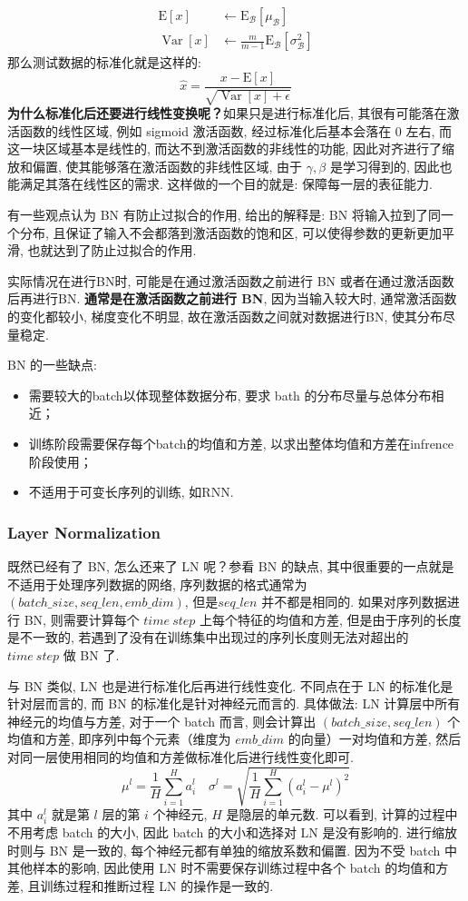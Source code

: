 $$
\begin{aligned}
	\mathrm{E}[x] & \leftarrow \mathrm{E}_{\mathcal{B}}\left[\mu_{\mathcal{B}}\right] \\
	\operatorname{Var}[x] & \leftarrow \frac{m}{m-1} \mathrm{E}_{\mathcal{B}}\left[\sigma_{\mathcal{B}}^{2}\right]
\end{aligned}
$$
那么测试数据的标准化就是这样的: 
$$
\widehat{x}=\frac{x-\mathrm{E}[x]}{\sqrt{\operatorname{Var}[x]+\epsilon}}
$$
\textbf{为什么标准化后还要进行线性变换呢？}如果只是进行标准化后, 其很有可能落在激活函数的线性区域, 例如 sigmoid 激活函数, 经过标准化后基本会落在 0 左右, 而这一块区域基本是线性的, 而达不到激活函数的非线性的功能, 因此对齐进行了缩放和偏置, 使其能够落在激活函数的非线性区域, 由于 $\gamma, \beta$ 是学习得到的, 因此也能满足其落在线性区的需求. 这样做的一个目的就是: 保障每一层的表征能力. 

有一些观点认为 BN 有防止过拟合的作用, 给出的解释是: BN 将输入拉到了同一个分布, 且保证了输入不会都落到激活函数的饱和区, 可以使得参数的更新更加平滑, 也就达到了防止过拟合的作用. 


实际情况在进行BN时, 可能是在通过激活函数之前进行 BN 或者在通过激活函数后再进行BN. \textbf{通常是在激活函数之前进行 BN}, 因为当输入较大时, 通常激活函数的变化都较小, 梯度变化不明显, 故在激活函数之间就对数据进行BN, 使其分布尽量稳定. 

BN 的一些缺点: 
\begin{itemize}
	\item 需要较大的batch以体现整体数据分布, 要求 bath 的分布尽量与总体分布相近；
	\item 训练阶段需要保存每个batch的均值和方差, 以求出整体均值和方差在infrence阶段使用；
	\item 不适用于可变长序列的训练, 如RNN. 
\end{itemize}

\subsubsection{Layer Normalization}
既然已经有了 BN, 怎么还来了 LN 呢？参看 BN 的缺点, 其中很重要的一点就是不适用于处理序列数据的网络, 序列数据的格式通常为 $(batch\_size, seq\_len, emb\_dim)$, 但是$seq\_len$ 并不都是相同的. 如果对序列数据进行 BN, 则需要计算每个 $time\ step$ 上每个特征的均值和方差, 但是由于序列的长度是不一致的, 若遇到了没有在训练集中出现过的序列长度则无法对超出的 $time\ step$ 做 BN 了. 

与 BN 类似, LN 也是进行标准化后再进行线性变化. 不同点在于 LN 的标准化是针对层而言的, 而 BN 的标准化是针对神经元而言的. 具体做法: LN 计算层中所有神经元的均值与方差, 对于一个 batch 而言, 则会计算出 $(batch\_size, seq\_len)$ 个均值和方差, 即序列中每个元素（维度为 $emb\_dim$ 的向量）一对均值和方差, 然后对同一层使用相同的均值和方差做标准化后进行线性变化即可. 
$$
\mu^{l}=\frac{1}{H} \sum_{i=1}^{H} a_{i}^{l} \quad \sigma^{l}=\sqrt{\frac{1}{H} \sum_{i=1}^{H}\left(a_{i}^{l}-\mu^{l}\right)^{2}}
$$
其中 $a_i^l$ 就是第 $l$ 层的第 $i$ 个神经元, $H$ 是隐层的单元数. 可以看到, 计算的过程中不用考虑 batch 的大小, 因此 batch 的大小和选择对 LN 是没有影响的. 进行缩放时则与 BN 是一致的, 每个神经元都有单独的缩放系数和偏置. 因为不受 batch 中其他样本的影响, 因此使用 LN 时不需要保存训练过程中各个 batch 的均值和方差, 且训练过程和推断过程 LN 的操作是一致的. 

